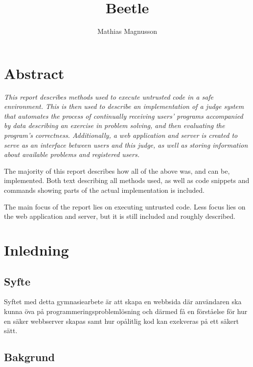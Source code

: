\documentclass{article}
\author{Mathias Magnusson}
\title{Beetle}
\date{}
\begin{document}
\maketitle{}

\section*{Abstract}

\begin{par}

\itshape
This report describes methods used to execute untrusted code in a safe
environment. This is then used to describe an implementation of a judge system
that automates the process of continually receiving users' programs accompanied
by data describing an exercise in problem solving, and then evaluating the
program's correctness. Additionally, a web application and server is created to
serve as an interface between users and this judge, as well as storing
information about available problems and registered users.

The majority of this report describes how all of the above was, and can be,
implemented. Both text describing all methods used, as well as code snippets and
commands showing parts of the actual implementation is included.

The main focus of the report lies on executing untrusted code. Less focus lies
on the web application and server, but it is still included and roughly
described.

\end{par}

\clearpage

\tableofcontents

\clearpage

\section{Inledning}

\subsection{Syfte}

Syftet med detta gymnasiearbete är att skapa en webbsida där användaren ska
kunna öva på programmeringsproblemlösning och därmed få en förståelse för hur
en säker webbserver skapas samt hur opålitlig kod kan exekveras på ett säkert
sätt.

\subsection{Bakgrund}
\end{document}
